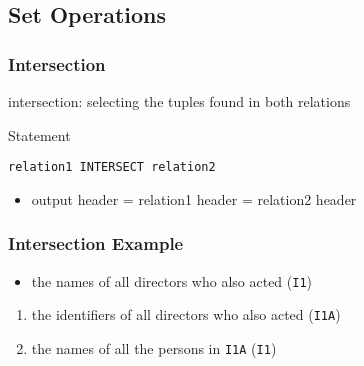 \documentclass[dvipsnames]{beamer}
\theoremstyle{plain}
\begin{document}
\subsection{Set Operations}

\begin{frame}[fragile]
  \frametitle{Intersection}

  \begin{definition}
    \alert{intersection}: selecting the tuples found in both relations
  \end{definition}

  \pause
  \begin{block}{Statement}
    \begin{lstlisting}
relation1 INTERSECT relation2
    \end{lstlisting}
  \end{block}

  \pause
  \begin{itemize}
    \item output header = relation1 header = relation2 header
  \end{itemize}
\end{frame}

\begin{frame}
  \frametitle{Intersection Example}

  \begin{example}
    \begin{itemize}
      \item the names of all directors who also acted (\texttt{I1})
    \end{itemize}

    \pause
    \begin{enumerate}
      \item the identifiers of all directors who also acted (\texttt{I1A})

      \pause
      \item the names of all the persons in \texttt{I1A} (\texttt{I1})
    \end{enumerate}
  \end{example}
\end{frame}
\end{document}
